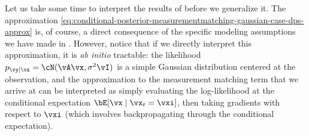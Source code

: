 \documentclass[../../book-main.tex]{subfiles}
\begin{document}
Let us take some time to interpret the results of
 before we generalize it.
The approximation \eqref{eq:conditional-posterior-measurementmatching-gaussian-case-dps-approx}
is, of course, a direct consequence of the specific modeling assumptions we have
made in . However, notice
that if we directly interpret this approximation, it is \textit{ab initio}
tractable: the likelihood $p_{\vy \mid \vx} = \cN(\vA\vx, \sigma^2 \vI)$ is
a simple Gaussian distribution centered at the observation, and the
approximation to the measurement matching term that we arrive at can be
interpreted as simply evaluating the log-likelihood at the conditional
expectation $\bE[\vx \mid \vx_t = \vxi]$, then taking gradients with respect
to $\vxi$ (which involves backpropagating through the conditional expectation).
\end{document}
